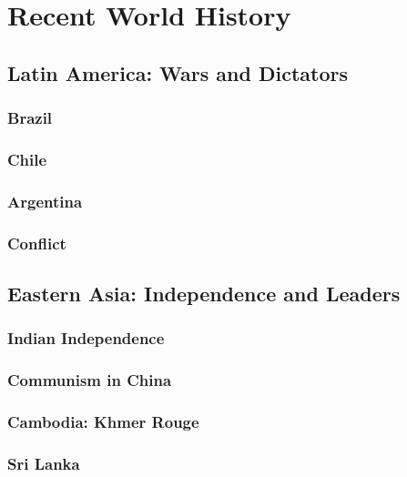 \chapter{Recent World History}

\section{Latin America: Wars and Dictators}

\subsection*{Brazil}

\subsection*{Chile}

\subsection*{Argentina}

\subsection*{Conflict}

\section{Eastern Asia: Independence and Leaders}

\subsection*{Indian Independence}

\subsection*{Communism in China}

\subsection*{Cambodia: Khmer Rouge}

\subsection*{Sri Lanka}

